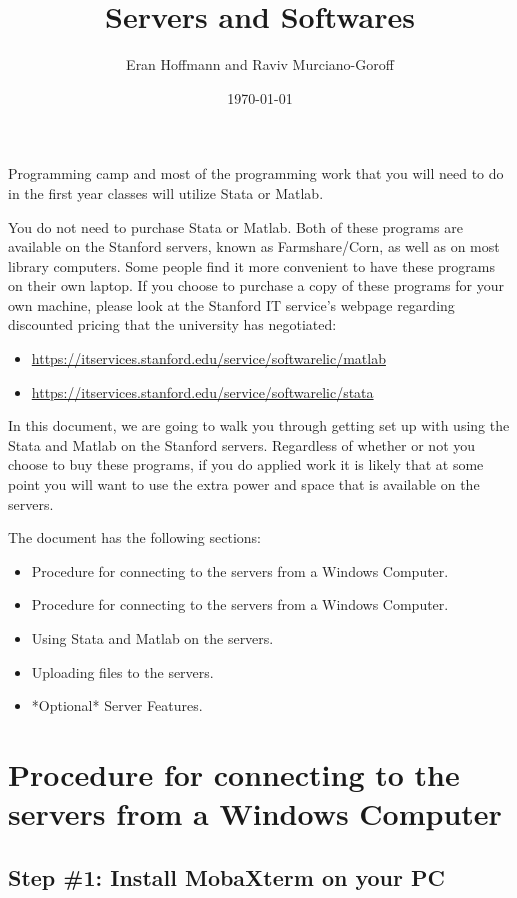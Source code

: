\documentclass[12pt]{article}
\title{Servers and Softwares}
\author{Eran Hoffmann and Raviv Murciano-Goroff}
\date{\today}
\begin{document}
\maketitle

Programming camp and most of the programming work that you will need to do in the first year classes will utilize Stata or Matlab.

You do not need to purchase Stata or Matlab. Both of these programs are available on the Stanford servers, known as Farmshare/Corn, as well as on most library computers. Some people find it more convenient to have these programs on their own laptop. If you choose to purchase a copy of these programs for your own machine, please look at the Stanford IT service's webpage regarding discounted pricing that the university has negotiated:

\begin{itemize}
  \item \url{https://itservices.stanford.edu/service/softwarelic/matlab}
  \item \url{https://itservices.stanford.edu/service/softwarelic/stata}
\end{itemize}


In this document, we are going to walk you through getting set up with using the Stata and Matlab on the Stanford servers. Regardless of whether or not you choose to buy these programs, if you do applied work it is likely that at some point you will want to use the extra power and space that is available on the servers. 


The document has the following sections:
\begin{itemize}
  \item Procedure for connecting to the servers from a Windows Computer.
  \item Procedure for connecting to the servers from a Windows Computer.
  \item Using Stata and Matlab on the servers.
  \item Uploading files to the servers.
  \item *Optional* Server Features.
\end{itemize}



\section{Procedure for connecting to the servers from a Windows Computer}


\subsection{Step \#1: Install MobaXterm on your PC}
\end{document}
